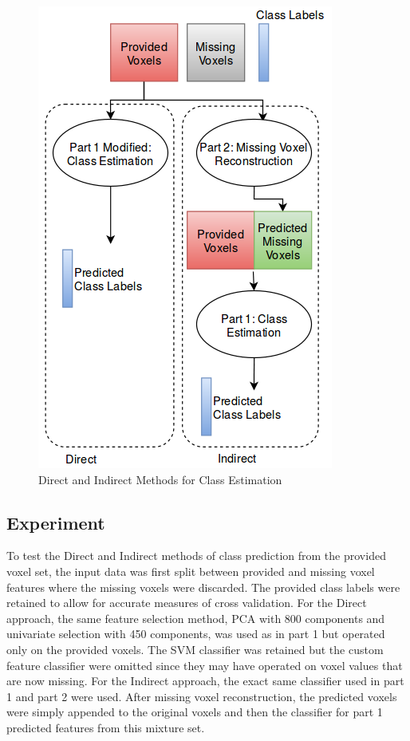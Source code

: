 \documentclass{article} %
\begin{document}
\begin{figure}[h]
	\begin{center}
		\includegraphics[scale=.35]{media/take2.png}
	\end{center}
	\caption{Direct and Indirect Methods for Class Estimation}
\end{figure}

\subsection{Experiment}
To test the Direct and Indirect methods of class prediction from the provided voxel set, the input data was first split between provided and missing voxel features where the missing voxels were discarded.  The provided class labels were retained to allow for accurate measures of cross validation.  For the Direct approach, the same feature selection method, PCA with 800 components and univariate selection with 450 components, was used as in part 1 but operated only on the provided voxels. The SVM classifier was retained but the custom feature classifier were omitted since they may have operated on voxel values that are now missing. For the Indirect approach, the exact same classifier used in part 1 and part 2 were used. After missing voxel reconstruction, the predicted voxels were simply appended to the original voxels and then the classifier for part 1 predicted features from this mixture set.
\end{document}
